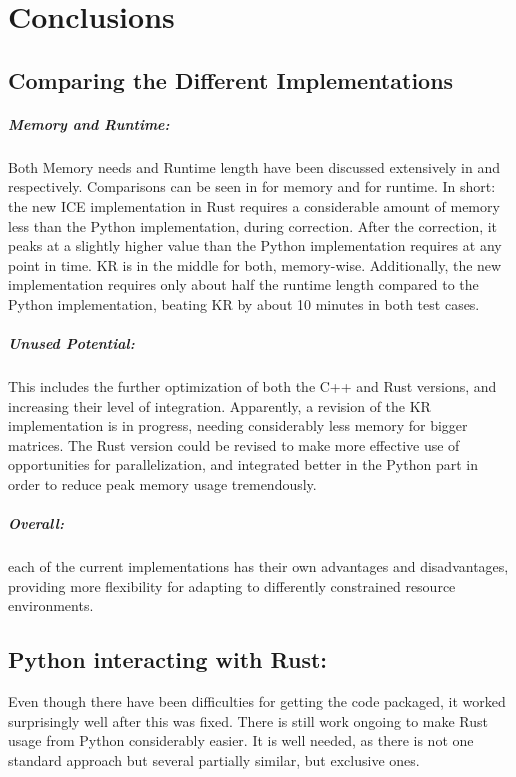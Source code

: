 \chapter{Conclusions}\label{chap:conclusion}


\section{Comparing the Different Implementations}

\paragraph{Memory and Runtime:}
Both Memory needs and Runtime length have been discussed extensively in
 and  respectively. Comparisons can be
seen in  for memory and  for runtime.
In short: the new ICE implementation in Rust requires a considerable amount of
memory less than the Python implementation, during correction. After the
correction, it peaks at a slightly higher value than the Python implementation
requires at any point in time. KR is in the middle for both, memory-wise.
Additionally, the new implementation requires only about half the runtime
length compared to the Python implementation, beating KR by about 10 minutes in
both test cases.


\paragraph{Unused Potential:}\label{sec:potential} This includes the further
optimization of both the C++ and Rust versions, and increasing their level of
integration. Apparently, a revision of the KR implementation is in progress,
needing considerably less memory for bigger matrices. The Rust version could be
revised to make more effective use of opportunities for parallelization, and
integrated better in the Python part in order to reduce peak memory usage
tremendously.


\paragraph{Overall:} each of the current implementations has their own
advantages and disadvantages, providing more flexibility for adapting to
differently constrained resource environments.


\section{Python interacting with Rust:} Even though there have been
difficulties for getting the code packaged, it worked surprisingly well after
this was fixed. There is still work ongoing to make Rust usage from Python
considerably easier. It is well needed, as there is not one standard
approach but several partially similar, but exclusive ones.

